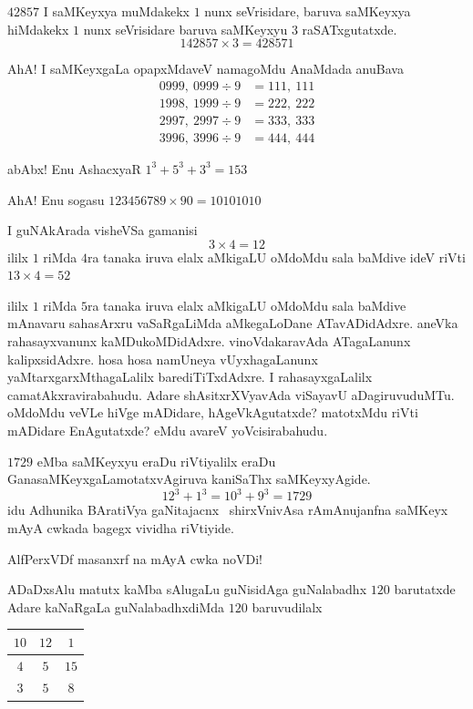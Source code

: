 $42857$ I saMKeyxya muMdakekx $1$ nunx seVrisidare, baruva saMKeyxya hiMdakekx $1$ nunx seVrisidare baruva saMKeyxyu $3$ raSATxgutatxde.
$$
142857 \times 3 = 428571
$$

AhA! I saMKeyxgaLa opapxMdaveV namagoMdu AnaMdada anuBava
\begin{align*}
0999, ~0999 \div 9 & =111, ~111\\
1998, ~1999 \div 9& =222, ~222\\
2997, ~2997 \div 9 &=333, ~ 333\\
3996, ~3996 \div 9&=444, ~444
\end{align*}

abAbx! Enu AshacxyaR $1^3 + 5^3 + 3^3 = 153$

AhA! Enu sogasu $123456789 \times 90=10101010$

I guNAkArada visheVSa gamanisi
$$
3 \times 4 = 12
$$
ililx $1$ riMda $4$ra tanaka iruva elalx aMkigaLU oMdoMdu sala baMdive ideV riVti $13 \times 4 = 52$

ililx $1$ riMda $5$ra tanaka iruva elalx aMkigaLU oMdoMdu sala baMdive mAnavaru sahasArxru vaSaRgaLiMda aMkegaLoDane ATavADidAdxre. aneVka rahasayxvanunx kaMDukoMDidAdxre. vinoVdakaravAda ATagaLanunx kalipxsidAdxre. hosa hosa namUneya vUyxhagaLanunx yaMtarxgarxMthagaLalilx barediTiTxdAdxre. I rahasayxgaLalilx camatAkxravirabahudu.  Adare shAsitxrXVyavAda viSayavU aDagiruvuduMTu. oMdoMdu veVLe hiVge mADidare, hAgeVkAgutatxde? matotxMdu riVti mADidare EnAgutatxde? eMdu avareV yoVcisirabahudu.

$1729$ eMba saMKeyxyu eraDu riVtiyalilx eraDu GanasaMKeyxgaLa\break motatxvAgiruva kaniSaThx saMKeyxyAgide.
$$
12^3 + 1^3 =10^3 + 9 ^3 = 1729
$$
idu Adhunika BAratiVya gaNitajacnx~ shirxVnivAsa rAmAnujanfna saMKeyx mAyA cwkada bagegx vividha riVtiyide.

AlfPerxVDf  masanxrf na mAyA cwka noVDi!

ADaDxsAlu matutx kaMba sAlugaLu guNisidAga guNalabadhx $120$ barutatxde Adare kaNaRgaLa guNalabadhxdiMda $120$ baruvudilalx
\begin{center}
\begin{tabular}{|c|c|c|}
\hline
$10$ & $12$ & $1$\\
\hline
$4$ & $5$ & $15$\\
\hline
$3$ & $5$ & $8$\\
\hline
\end{tabular}
\end{center}

